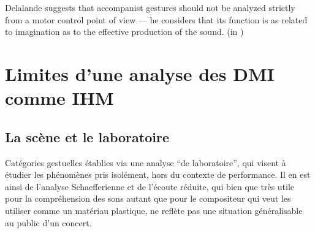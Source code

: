 Delalande suggests that accompanist gestures should not be analyzed strictly from a motor control point of view — he considers that its function is as related to imagination as to the effective production of the sound. (in \cite{cadoz_gesture_2000})



\section{Limites d'une analyse des DMI comme IHM}
\label{sec:gesture:limitesIHM}

\subsection{La scène et le laboratoire}
Catégories gestuelles établies via une analyse ``de laboratoire'', qui visent à étudier les phénomènes pris isolément, hors du contexte de performance. Il en est ainsi de l'analyse Schaefferienne et de l'écoute réduite, qui bien que très utile pour la compréhension des sons autant que pour le compositeur qui veut les utiliser comme un matériau plastique, ne reflète pas une situation généralisable au public d'un concert.

